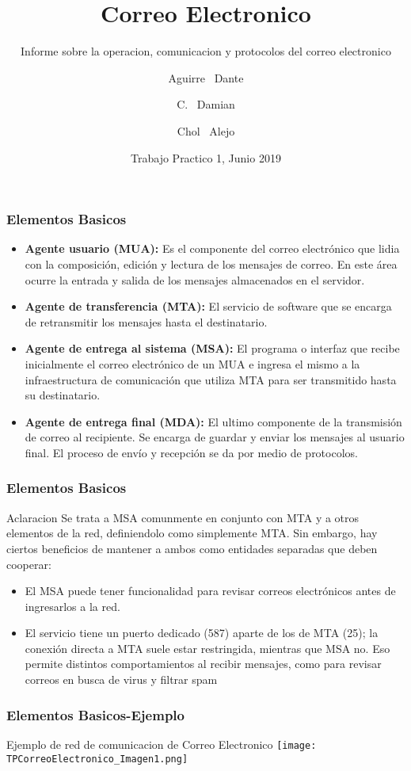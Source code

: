 \documentclass{beamer}
\title[Correo Electronico] %
{Correo Electronico}
\subtitle{Informe sobre la operacion, comunicacion y protocolos del correo electronico}
\author[Grupo C] %
{Aguirre ~Dante \and C. ~Damian \and Chol ~Alejo}
\institute[IPS] %
{
  \inst{}%
  Especialidad Informatica, 6to año\\
  Instituto Politecnico Superior Gral. San Martin
}
\date[TP1 2019] %
{Trabajo Practico 1, Junio 2019}
\begin{document}
 
\frame{\titlepage}



\begin{frame}
\frametitle{Elementos Basicos}
\tableofcontents

\begin{itemize}
\item \textbf{Agente usuario (MUA):} Es el componente del correo electrónico que lidia con la composición, edición y lectura de los mensajes de correo. En este área ocurre la entrada y salida de los mensajes almacenados en el servidor. 
\item \textbf{ Agente de transferencia (MTA):}
El servicio de software que se encarga de retransmitir los mensajes hasta el destinatario.
\item \textbf{Agente de entrega al sistema (MSA):}
El programa o interfaz que recibe inicialmente el correo electrónico de un MUA e ingresa el mismo a la infraestructura de comunicación que utiliza MTA para ser transmitido hasta su destinatario. 
\item \textbf{Agente de entrega final (MDA):}
El ultimo componente de la transmisión de correo al recipiente. Se encarga de guardar y enviar los mensajes al usuario final. El proceso de envío y recepción se da por medio de protocolos.
\end{itemize}

\end{frame}

\begin{frame}
\frametitle{Elementos Basicos}
\tableofcontents

\begin{block}{Aclaracion}
Se trata a MSA comunmente en conjunto con MTA y a otros elementos de la red, definiendolo como simplemente MTA. Sin embargo, hay ciertos beneficios de mantener a ambos como entidades separadas que deben cooperar:
\begin{itemize}
\item El MSA puede tener funcionalidad para revisar correos electrónicos antes de ingresarlos a la red.
\item El servicio tiene un puerto dedicado (587) aparte de los de MTA (25); la conexión directa a MTA suele estar restringida, mientras que MSA no. Eso permite distintos comportamientos al recibir mensajes, como para revisar correos en busca de virus y filtrar spam
\end{itemize}
\end{block}

\end{frame}
\begin{frame}
\frametitle{Elementos Basicos-Ejemplo}
\tableofcontents

Ejemplo de red de comunicacion de Correo Electronico
\texttt{[image: TPCorreoElectronico\_Imagen1.png]}

\end{frame}
\end{document}
